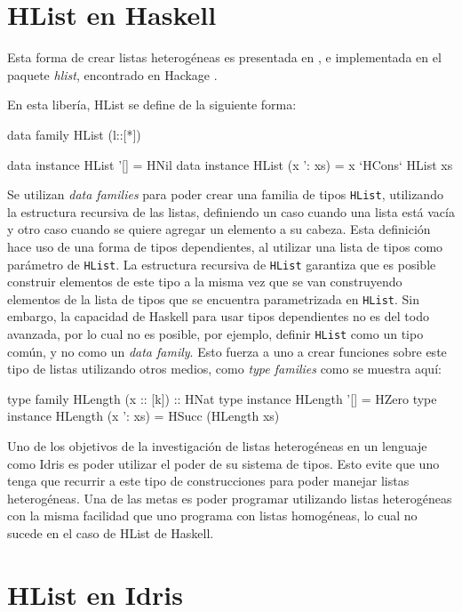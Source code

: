 \section{HList en Haskell}

Esta forma de crear listas heterogéneas es presentada en \cite{Kiselyov:2004:STH:1017472.1017488}, e implementada en el paquete \textit{hlist}, encontrado en Hackage \cite{HListHackage}.

En esta libería, HList se define de la siguiente forma:

\begin{code}
data family HList (l::[*])

data instance HList '[] = HNil
data instance HList (x ': xs) = x `HCons` HList xs
\end{code}

Se utilizan \textit{data families} para poder crear una familia de tipos \texttt{HList}, utilizando la estructura recursiva de las listas, definiendo un caso cuando una lista está vacía y otro caso cuando se quiere agregar un elemento a su cabeza.
Esta definición hace uso de una forma de tipos dependientes, al utilizar una lista de tipos como parámetro de \texttt{HList}. La estructura recursiva de \texttt{HList} garantiza que es posible construir elementos de este tipo a la misma vez que se van construyendo elementos de la lista de tipos que se encuentra parametrizada en \texttt{HList}.
Sin embargo, la capacidad de Haskell para usar tipos dependientes no es del todo avanzada, por lo cual no es posible, por ejemplo, definir \texttt{HList} como un tipo común, y no como un \textit{data family}. Esto fuerza a uno a crear funciones sobre este tipo de listas utilizando otros medios, como \textit{type families} como se muestra aquí:

\begin{code}
type family HLength (x :: [k]) :: HNat
type instance HLength '[] = HZero
type instance HLength (x ': xs) = HSucc (HLength xs)
\end{code}

Uno de los objetivos de la investigación de listas heterogéneas en un lenguaje como Idris es poder utilizar el poder de su sistema de tipos. Esto evite que uno tenga que recurrir a este tipo de construcciones para poder manejar listas heterogéneas. Una de las metas es poder programar utilizando listas heterogéneas con la misma facilidad que uno programa con listas homogéneas, lo cual no sucede en el caso de HList de Haskell.

\section{HList en Idris}

